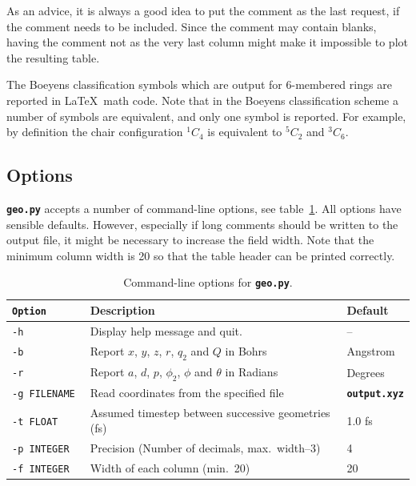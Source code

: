 \documentclass[a4paper,11pt,DIV=15,openany,twoside=false]{scrbook}
\newcommand{\ttt}[1]{\textbf{\texttt{#1}}}
\begin{document}
As an advice, it is always a good idea to put the comment as the last request, if the comment needs to be included. Since the comment may contain blanks, having the comment not as the very last column might make it impossible to plot the resulting table.

The Boeyens classification symbols which are output for 6-membered rings are reported in \LaTeX\ math code. Note that in the Boeyens classification scheme a number of symbols are equivalent, and only one symbol is reported. For example, by definition the chair configuration $^1C_4$ is equivalent to $^5C_2$ and $^3C_6$.

\subsection{Options}

\ttt{geo.py} accepts a number of command-line options, see table~\ref{tab:Geo_options}. All options have sensible defaults. However, especially if long comments should be written to the output file, it might be necessary to increase the field width. Note that the minimum column width is 20 so that the table header can be printed correctly.

\begin{table}[h]
  \centering
  \caption{Command-line options for \ttt{geo.py}. }
  \label{tab:Geo_options}
  \begin{tabular}{>{\tt}lll}
    \toprule
    \rmfamily Option         &Description    &Default\\
    \midrule
    -h          &Display help message and quit.         & --        \\
    -b          &Report $x$, $y$, $z$, $r$, $q_2$ and $Q$ in Bohrs       &Angstrom\\
    -r          &Report $a$, $d$, $p$, $\phi_2$, $\phi$ and $\theta$ in Radians         &Degrees\\
    -g FILENAME &Read coordinates from the specified file       &\ttt{output.xyz}\\
    -t FLOAT    &Assumed timestep between successive geometries (fs)    &1.0 fs\\
    -p INTEGER  &Precision (Number of decimals, max.~width--3)         &4\\
    -f INTEGER  &Width of each column (min.~20)                   &20\\
    \bottomrule
  \end{tabular}
\end{table}
\end{document}

